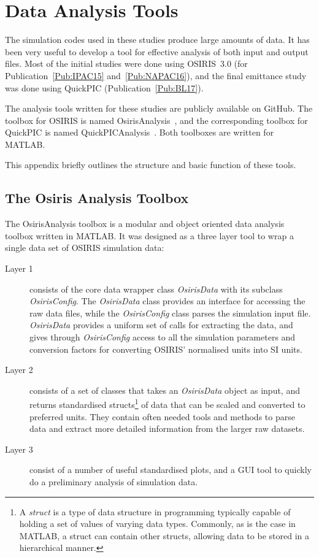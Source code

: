 %
%

\chapter{Data Analysis Tools}
\label{Apx:DA}

The simulation codes used in these studies produce large amounts of data.
It has been very useful to develop a tool for effective analysis of both input and output files.
Most of the initial studies were done using OSIRIS~3.0 (for Publication~\ref{Pub:IPAC15} and~\ref{Pub:NAPAC16}), and the final emittance study was done using QuickPIC (Publication~\ref{Pub:BL17}).

The analysis tools written for these studies are publicly available on GitHub.
The toolbox for OSIRIS is named OsirisAnalysis~\cite{code:osiris_analysis:2013}, and the corresponding toolbox for QuickPIC is named QuickPICAnalysis~\cite{code:quickpic_analysis:2017}.
Both toolboxes are written for MATLAB.

This appendix briefly outlines the structure and basic function of these tools.

\section{The Osiris Analysis Toolbox}
\label{Tools:OA}

The OsirisAnalysis toolbox is a modular and object oriented data analysis toolbox written in MATLAB.
It was designed as a three layer tool to wrap a single data set of OSIRIS simulation data:

\begin{description}
    \item[Layer 1] consists of the core data wrapper class \emph{OsirisData} with its subclass \emph{OsirisConfig}.
        The \emph{OsirisData} class provides an interface for accessing the raw data files, while the \emph{OsirisConfig} class parses the simulation input file.
        \emph{OsirisData} provides a uniform set of calls for extracting the data, and gives through \emph{OsirisConfig} access to all the simulation parameters and conversion factors for converting OSIRIS' normalised units into SI units.
    \item[Layer 2] consists of a set of classes that takes an \emph{OsirisData} object as input, and returns standardised structs\footnote{A \textit{struct} is a type of data structure in programming typically capable of holding a set of values of varying data types. Commonly, as is the case in MATLAB, a struct can contain other structs, allowing data to be stored in a hierarchical manner.} of data that can be scaled and converted to preferred units.
    They contain often needed tools and methods to parse data and extract more detailed information from the larger raw datasets.
    \item[Layer 3] consist of a number of useful standardised plots, and a GUI tool to quickly do a preliminary analysis of simulation data.
\end{description}

